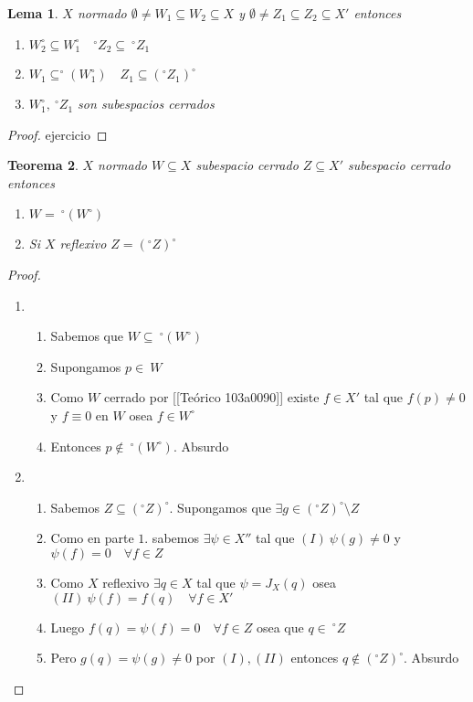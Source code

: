 \documentclass[10pt]{extarticle}
\theoremstyle{break}
\newtheorem{theorem}{Teorema}[section]
\newtheorem{lemma}[theorem]{Lema}
\theoremstyle{definition}
\begin{document}
\begin{lemma}
$X$ normado $\emptyset\neq W_{1}\subseteq W_{2}\subseteq X$ y $\emptyset\neq Z_{1}\subseteq Z_{2}\subseteq X'$ entonces
\begin{enumerate}
	\item $W_{2}^{\circ}\subseteq W_{1}^{\circ}\quad ^{\circ}Z_{2}\subseteq \ ^{\circ}Z_{1}$
	\item $W_{1}\subseteq ^{\circ}(W_{1}^{\circ})\quad Z_{1}\subseteq (^{\circ}Z_{1})^{\circ}$
	\item $W_{1}^{\circ},\ ^{\circ}Z_{1}$ son subespacios cerrados
\end{enumerate}
\end{lemma}
\begin{proof}
 ejercicio
\end{proof}

\begin{theorem}\label{12.6}
$X$ normado $W\subseteq X$ subespacio cerrado $Z\subseteq X'$ subespacio cerrado entonces
	\begin{enumerate}[(a.)] 
	\item $W=\ ^{\circ}(W^{\circ})$
	\item Si $X$ reflexivo $Z=(^{\circ}Z)^{\circ}$
\end{enumerate}
\end{theorem}

\begin{proof}
	\begin{enumerate}[(a.)] 
		\item\begin{enumerate}[1.] 
				\item  Sabemos que $W\subseteq \ ^{\circ}(W^{\circ} )$
				\item Supongamos $p \in \ W$ 
				\item Como $W$ cerrado por [[Teórico 103a0090]] existe $f\in X'$ tal que $f(p)\neq 0$ y $f\equiv 0$ en $W$ osea $f\in W^{\circ}$
				\item Entonces $p \not\in \ ^{\circ}(W^{\circ})$. Absurdo
		\end{enumerate}
	\item \begin{enumerate}[1.] 
			\item Sabemos $Z\subseteq (^\circ Z)^{\circ}$. Supongamos que $\exists g\in (^{\circ}Z)^{\circ}\setminus Z$
				\item Como en parte $1.$ sabemos $\exists \psi \in X''$ tal que $(I) \ \psi(g)\neq 0$ y $\psi(f)=0\quad\forall f\in Z$
				\item Como $X$ reflexivo $\exists q\in X$ tal que $\psi=J_{X}(q)$ osea $(II)\ \psi(f)=f(q)\quad\forall f\in X'$
				\item Luego $f(q)=\psi(f)=0\quad\forall f\in Z$ osea que $q\in\ ^{\circ}Z$
				\item  Pero $g(q)=\psi(g)\neq 0$ por $(I),(II)$ entonces $q\not\in (^{\circ}Z)^{\circ}$. Absurdo
		\end{enumerate}	\end{enumerate}
\end{proof}
\end{document}
